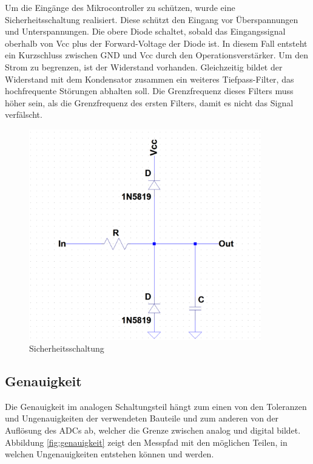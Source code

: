 Um die Eingänge des Mikrocontroller zu schützen, wurde eine Sicherheitsschaltung realisiert. Diese schützt den Eingang vor Überspannungen und Unterspannungen. Die obere Diode schaltet, sobald das Eingangssignal oberhalb von Vcc plus der Forward-Voltage der Diode ist. In diesem Fall entsteht ein Kurzschluss zwischen GND und Vcc durch den Operationsverstärker. Um den Strom zu begrenzen, ist der Widerstand vorhanden. Gleichzeitig bildet der Widerstand mit dem Kondensator zusammen ein weiteres Tiefpass-Filter, das hochfrequente Störungen abhalten soll.  Die Grenzfrequenz dieses Filters muss höher sein, als die Grenzfrequenz des ersten Filters, damit es nicht das Signal verfälscht.


\begin{figure}[H]
\begin{center}
\includegraphics[width=0.9\textwidth]{images/Analoge_Schaltung_Sicherung.png}
\caption{Sicherheitsschaltung}
\label{fig:Sicherheitsschaltung}
\end{center}
\end{figure}

\subsection{Genauigkeit}%
Die Genauigkeit im analogen Schaltungsteil hängt zum einen von den Toleranzen und Ungenauigkeiten der verwendeten Bauteile und zum anderen von der Auflösung des ADCs ab, welcher die Grenze zwischen analog und digital bildet. Abbildung \ref{fig:genauigkeit} zeigt den Messpfad mit den möglichen Teilen, in welchen Ungenauigkeiten entstehen können und werden.

